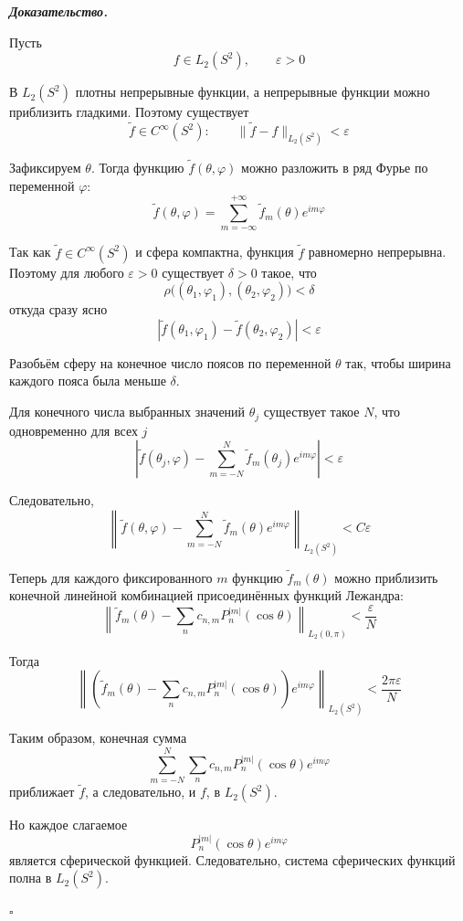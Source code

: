 \documentclass[11pt,a4paper]{report}
\numberwithin{equation}{section}
\numberwithin{figure}{chapter}
\numberwithin{table}{chapter}
\newenvironment{myproof}{%
    \begin{tcolorbox}[mathphysblock,colframe=proofcolor!65,colback=proofcolor!2,boxrule=0.5pt]
    \textit{\textbf{Доказательство.}}\par\smallskip
}{%
    \hfill$\square$
    \end{tcolorbox}
}
\begin{document}
\begin{myproof}

Пусть
\[
f\in L_2(S^2),
\qquad
\varepsilon>0
\]

В $L_2(S^2)$ плотны непрерывные функции, а непрерывные функции можно приблизить
гладкими. Поэтому существует
\[
\widetilde f\in C^\infty(S^2):
\qquad
\|\widetilde f-f\|_{L_2(S^2)}<\varepsilon
\]

Зафиксируем $\theta$. Тогда функцию $\widetilde f(\theta,\varphi)$ можно разложить
в ряд Фурье по переменной $\varphi$:
\[
\widetilde f(\theta,\varphi)
=
\sum_{m=-\infty}^{+\infty}
\widetilde f_m(\theta)e^{im\varphi}
\]

Так как $\widetilde f\in C^\infty(S^2)$ и сфера компактна, функция
$\widetilde f$ равномерно непрерывна. Поэтому для любого $\varepsilon>0$
существует $\delta>0$ такое, что
\[
\rho\bigl((\theta_1,\varphi_1),(\theta_2,\varphi_2)\bigr)<\delta
\]
откуда сразу ясно
\[
\left|
\widetilde f(\theta_1,\varphi_1)
-
\widetilde f(\theta_2,\varphi_2)
\right|
<\varepsilon
\]

Разобьём сферу на конечное число поясов по переменной $\theta$ так, чтобы
ширина каждого пояса была меньше $\delta$.

Для конечного числа выбранных значений $\theta_j$ существует такое $N$, что
одновременно для всех $j$
\[
\left|
\widetilde f(\theta_j,\varphi)
-
\sum_{m=-N}^{N}
\widetilde f_m(\theta_j)e^{im\varphi}
\right|
<\varepsilon
\]

Следовательно,
\[
\left\|
\widetilde f(\theta,\varphi)
-
\sum_{m=-N}^{N}
\widetilde f_m(\theta)e^{im\varphi}
\right\|_{L_2(S^2)}
< C\varepsilon
\]

Теперь для каждого фиксированного $m$ функцию $\widetilde f_m(\theta)$
можно приблизить конечной линейной комбинацией присоединённых функций
Лежандра:
\[
\left\|
\widetilde f_m(\theta)
-
\sum_n c_{n,m}P_n^{|m|}(\cos\theta)
\right\|_{L_2(0,\pi)}
<
\frac{\varepsilon}{N}
\]

Тогда
\[
\left\|
\left(
\widetilde f_m(\theta)
-
\sum_n c_{n,m}P_n^{|m|}(\cos\theta)
\right)e^{im\varphi}
\right\|_{L_2(S^2)}
<
\frac{2\pi\varepsilon}{N}
\]

Таким образом, конечная сумма
\[
\sum_{m=-N}^{N}
\sum_n
c_{n,m}
P_n^{|m|}(\cos\theta)e^{im\varphi}
\]
приближает $\widetilde f$, а следовательно, и $f$, в $L_2(S^2)$.

Но каждое слагаемое
\[
P_n^{|m|}(\cos\theta)e^{im\varphi}
\]
является сферической функцией. Следовательно, система сферических функций
полна в $L_2(S^2)$.

\end{myproof}
\end{document}
